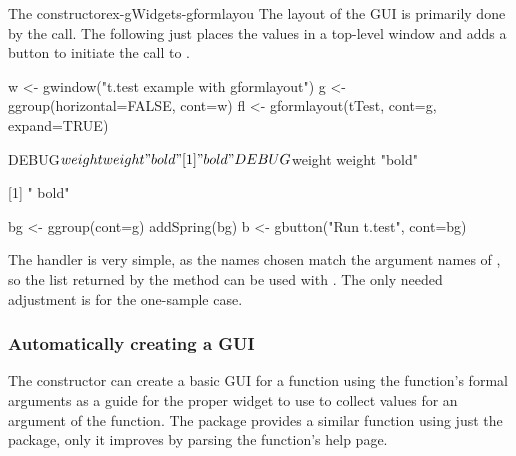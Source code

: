 \begin{example}{The  constructor}{ex-gWidgets-gformlayou}
The layout of the GUI is primarily done by the 
call. The following just places the values in a top-level window and adds a
button to initiate the call to .

\begin{Schunk}
\begin{Sinput}
 w <- gwindow("t.test example with gformlayout")
 g <- ggroup(horizontal=FALSE, cont=w)
 fl <- gformlayout(tTest, cont=g, expand=TRUE)
\end{Sinput}
\begin{Soutput}
DEBUG$weight
weight 
"bold" 

[1] " bold"
DEBUG$weight
weight 
"bold" 

[1] " bold"
\end{Soutput}
\begin{Sinput}
 bg <- ggroup(cont=g)
 addSpring(bg)
 b <- gbutton("Run t.test", cont=bg)
\end{Sinput}
\end{Schunk}

The handler is very simple, as the names chosen match the argument
names of , so the list returned by the 
method can be used with . The only needed adjustment is
for the one-sample case.

\begin{Schunk}
\end{Schunk}

\end{example}

\subsubsection{Automatically creating a GUI}
\label{sec:gWidgets-autom-creat-gui}

The  constructor can create a basic GUI
for a function using the function's formal arguments as a guide for
the proper widget to use to collect values for an argument of the
function. The  package provides a similar function using
just the  package, only it improves  by
parsing the function's help page.


